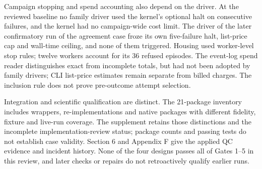 Campaign stopping and spend accounting also depend on the driver.
At the reviewed baseline no family driver used the kernel's optional
halt on consecutive failures, and the kernel had no campaign-wide
cost limit. The driver of the later confirmatory run of the agreement case froze its
own five-failure halt, list-price cap and wall-time ceiling, and none of them triggered. Housing used worker-level stop rules; twelve
workers account for its 36 refused episodes. The event-log spend reader
distinguishes exact from incomplete totals, but had not been adopted by
family drivers; CLI list-price estimates remain separate from billed
charges. The inclusion rule does not prove pre-outcome attempt selection.

Integration and scientific qualification are distinct. The 21-package
inventory includes wrappers, re-implementations and native packages with
different fidelity, fixture and live-run coverage. The supplement retains
those distinctions and the incomplete implementation-review status;
package counts and passing tests do not establish case validity.
Section 6 and Appendix F give the applied QC evidence and incident
history. None of the four designs passes all of Gates 1--5 in this review,
and later checks or repairs do not retroactively qualify earlier runs.
